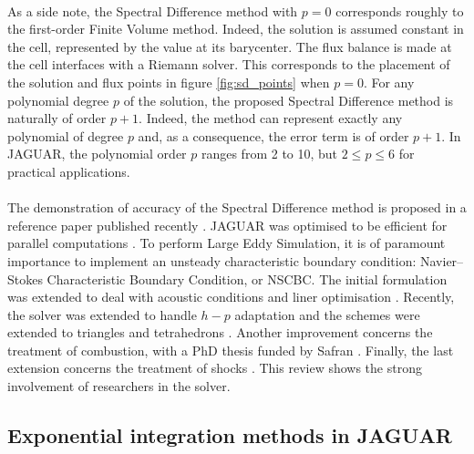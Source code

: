       \paragraph{}
      As a side note, the Spectral Difference method with $p = 0$ corresponds roughly to the first-order Finite Volume method.
      Indeed, the solution is assumed constant in the cell, represented by the value at its barycenter.
      The flux balance is made at the cell interfaces with a Riemann solver.
      This corresponds to the placement of the solution and flux points in figure \ref{fig:sd_points} when $p = 0$.
      For any polynomial degree $p$ of the solution, the proposed Spectral Difference method is naturally of order $p + 1$.
      Indeed, the method can represent exactly any polynomial of degree $p$ and, as a consequence, the error term is of order $p + 1$.
      In JAGUAR, the polynomial order $p$ ranges from 2 to 10, but $2 \le p \le 6$ for practical applications.

      \paragraph{}
      The demonstration of accuracy of the Spectral Difference method is proposed in a reference paper published recently \cite{VanharenPuigtVasseurEtAl2017}.
      JAGUAR was optimised to be efficient for parallel computations \cite{Cassagne2014, CassagnePuigtBoussuge2015, Marait2015}.
      To perform Large Eddy Simulation, it is of paramount importance to implement an unsteady characteristic boundary condition: Navier--Stokes Characteristic Boundary Condition, or NSCBC.
      The initial formulation \cite{FievetDeniauPiot2020} was extended to deal with acoustic conditions and liner optimisation \cite{CardesaFievetPiotEtAl2022}.
      Recently, the solver was extended to handle $h-p$ adaptation \cite{HartmannBalanBassiEtAl2021} and the schemes were extended to triangles and tetrahedrons \cite{VeilleuxPuigtDeniauEtAl2022, VeilleuxPuigtDeniauEtAl2022a}.
      Another improvement concerns the treatment of combustion, with a PhD thesis funded by Safran \cite{MarchalDeniauBoussugeEtAl2021}.
      Finally, the last extension concerns the treatment of shocks \cite{DeniauPuigt2022}.
      This review shows the strong involvement of researchers in the solver.


    \subsection{Exponential integration methods in JAGUAR}

